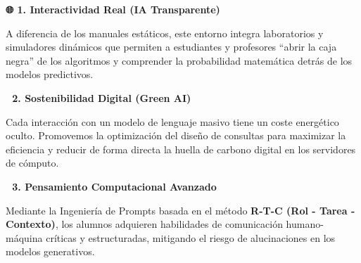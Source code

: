 \documentclass[
  spanish,
  letterpaper,
  DIV=11,
  numbers=noendperiod,
  oneside]{scrreprt}
\begin{document}
\begin{tcolorbox}[enhanced jigsaw, arc=.35mm, bottomrule=.15mm, breakable, colback=white, colframe=quarto-callout-note-color-frame, left=2mm, leftrule=.75mm, opacityback=0, rightrule=.15mm, toprule=.15mm]

\vspace{-3mm}\textbf{🌐 1. Interactividad Real (IA Transparente)}\vspace{3mm}

A diferencia de los manuales estáticos, este entorno integra
laboratorios y simuladores dinámicos que permiten a estudiantes y
profesores ``abrir la caja negra'' de los algoritmos y comprender la
probabilidad matemática detrás de los modelos predictivos.

\end{tcolorbox}

\begin{tcolorbox}[enhanced jigsaw, arc=.35mm, bottomrule=.15mm, breakable, colback=white, colframe=quarto-callout-tip-color-frame, left=2mm, leftrule=.75mm, opacityback=0, rightrule=.15mm, toprule=.15mm]

\vspace{-3mm}\textbf{🌿 2. Sostenibilidad Digital (Green AI)}\vspace{3mm}

Cada interacción con un modelo de lenguaje masivo tiene un coste
energético oculto. Promovemos la optimización del diseño de consultas
para maximizar la eficiencia y reducir de forma directa la huella de
carbono digital en los servidores de cómputo.

\end{tcolorbox}

\begin{tcolorbox}[enhanced jigsaw, arc=.35mm, bottomrule=.15mm, breakable, colback=white, colframe=quarto-callout-important-color-frame, left=2mm, leftrule=.75mm, opacityback=0, rightrule=.15mm, toprule=.15mm]

\vspace{-3mm}\textbf{🧠 3. Pensamiento Computacional Avanzado}\vspace{3mm}

Mediante la Ingeniería de Prompts basada en el método \textbf{R-T-C (Rol
- Tarea - Contexto)}, los alumnos adquieren habilidades de comunicación
humano-máquina críticas y estructuradas, mitigando el riesgo de
alucinaciones en los modelos generativos.

\end{tcolorbox}
\end{document}
